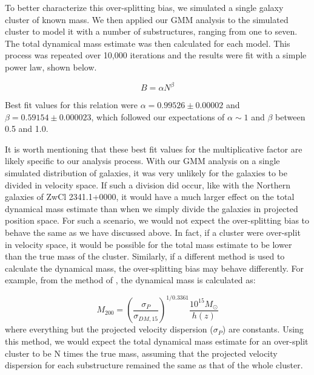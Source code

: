 \documentclass[onecolumn]{aastex}
\begin{document}
To better characterize this over-splitting bias, we simulated a single galaxy cluster of known mass.  We then applied our GMM analysis to the simulated cluster to model it with a number of substructures, ranging from one to seven.  The total dynamical mass estimate was then calculated for each model.  This process was repeated over 10,000 iterations and the results were fit with a simple power law, shown below.

\begin{equation}
B = \alpha N^{\beta}
\end{equation}

Best fit values for this relation were $\alpha = 0.99526 \pm 0.00002$ and $\beta = 0.59154 \pm 0.000023$, which followed our expectations of $\alpha \sim 1$ and $\beta$ between 0.5 and 1.0.  

It is worth mentioning that these best fit values for the multiplicative factor are likely specific to our analysis process.  With our GMM analysis on a single simulated distribution of galaxies, it was very unlikely for the galaxies to be divided in velocity space.  If such a division did occur, like with the Northern galaxies of ZwCl 2341.1+0000, it would have a much larger effect on the total dynamical mass estimate than when we simply divide the galaxies in projected position space.  For such a scenario, we would not expect the over-splitting bias to behave the same as we have discussed above.  In fact, if a cluster were over-split in velocity space, it would be possible for the total mass estimate to be lower than the true mass of the cluster.  Similarly, if a different method is used to calculate the dynamical mass, the over-splitting bias may behave differently.  For example, from the method of \cite{Evrard08}, the dynamical mass is calculated as:

\begin{equation}
M_{200} = \left(\frac{\sigma_P}{\sigma_{DM,15}}\right)^{1/0.3361} \frac{10^{15}M_{\odot}}{h(z)}
\end{equation}
where everything but the projected velocity dispersion ($\sigma_P$) are constants.  Using this method, we would expect the total dynamical mass estimate for an over-split cluster to be N times the true mass, assuming that the projected velocity dispersion for each substructure remained the same as that of the whole cluster.




\label{lastpage}
\end{document}
